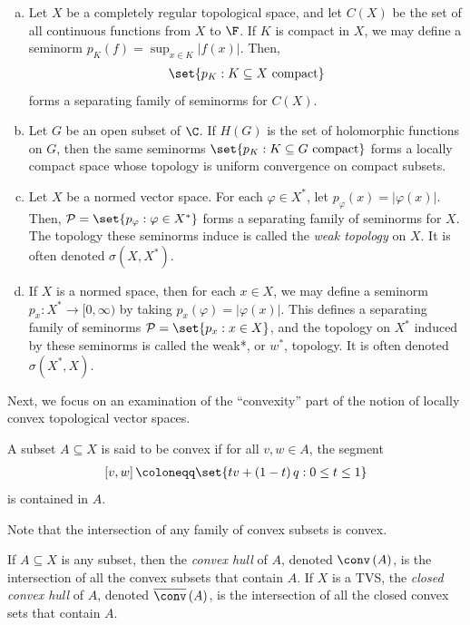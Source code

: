 \documentclass[10pt]{mypackage}
\renewcommand{\coloneq}{\coloneqq}
\begin{document}
\begin{example}\hfill
  \begin{enumerate}[(a)]
    \item Let $X$ be a completely regular topological space, and let $C(X)$ be the set of all continuous functions from $X$ to $\F$. If $K$ is compact in $X$, we may define a seminorm $p_K\left( f \right) = \sup_{x\in K}\left\vert f(x) \right\vert$. Then, 
      \begin{align*}
        \set{p_K : K\subseteq X\text{ compact}}
      \end{align*}
      forms a separating family of seminorms for $C(X)$.
    \item Let $G$ be an open subset of $\C$. If $H(G)$ is the set of holomorphic functions on $G$, then the same seminorms $\set{p_K : K\subseteq G\text{ compact}}$ forms a locally compact space whose topology is uniform convergence on compact subsets.
    \item Let $X$ be a normed vector space. For each $\varphi\in X^{\ast}$, let $p_{\varphi}(x) = \left\vert \varphi(x) \right\vert$. Then, $ \mathcal{P} = \set{p_{\varphi} : \varphi\in X^{\ast}} $ forms a separating family of seminorms for $X$. The topology these seminorms induce is called the \textit{weak topology} on $X$. It is often denoted $\sigma\left( X,X^{\ast} \right)$.
    \item If $X$ is a normed space, then for each $x\in X$, we may define a seminorm $p_x\colon X^{\ast}\rightarrow [0,\infty)$ by taking $p_x\left( \varphi \right) = \left\vert \varphi(x) \right\vert$. This defines a separating family of seminorms $\mathcal{P} = \set{p_x : x\in X}$, and the topology on $X^{\ast}$ induced by these seminorms is called the weak*, or $w^{\ast}$, topology. It is often denoted $\sigma\left( X^{\ast},X \right)$.
  \end{enumerate}
\end{example}
Next, we focus on an examination of the ``convexity'' part of the notion of locally convex topological vector spaces.
\begin{definition}
  A subset $A\subseteq X$ is said to be convex if for all $v,w\in A$, the segment
  \begin{align*}
    \left[ v,w \right]\coloneq \set{tv + \left( 1-t \right)q : 0\leq t \leq 1}
  \end{align*}
  is contained in $A$.
\end{definition}
Note that the intersection of any family of convex subsets is convex.
\begin{definition}
  If $A\subseteq X$ is any subset, then the \textit{convex hull} of $A$, denoted $ \conv\left( A \right) $, is the intersection of all the convex subsets that contain $A$. If $X$ is a TVS, the \textit{closed convex hull} of $A$, denoted $ \overline{\conv}\left( A \right) $, is the intersection of all the closed convex sets that contain $A$.
\end{definition}
\end{document}
